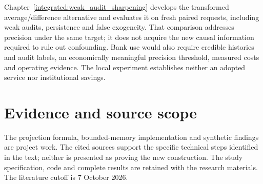 Chapter~\ref{integrated:weak_audit_sharpening} develops the transformed average/difference alternative and evaluates it on fresh paired requests, including weak audits, persistence and false exogeneity. That comparison addresses precision under the same target; it does not acquire the new causal information required to rule out confounding. Bank use would also require
credible histories and audit labels, an economically meaningful precision
threshold, measured costs and operating evidence. The local experiment
establishes neither an adopted service nor institutional savings.

\section*{Evidence and source scope}

The projection formula, bounded-memory implementation and synthetic
findings are project work. The cited sources support the specific technical
steps identified in the text; neither is presented as proving the new
construction. The study specification, code and complete results are retained
with the research materials. The literature cutoff is 7 October 2026.


